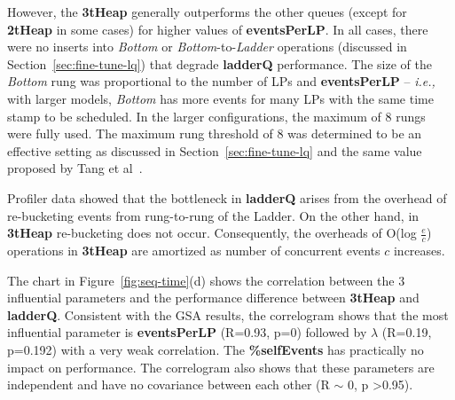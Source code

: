 However, the \textbf{3tHeap} generally outperforms the other queues (except for \textbf{2tHeap} in some cases) for higher values of \textbf{events\-Per\-LP}. In all cases, there were no inserts into \emph{Bottom} or \emph{Bottom}-to-\emph{Ladder} operations (discussed in Section~\ref{sec:fine-tune-lq}) that degrade \textbf{ladderQ} performance. The size of the \emph{Bottom} rung was proportional to the number of LPs and \textbf{eventsPerLP} -- \textit{i.e.,} with larger models, \emph{Bottom} has more events for many LPs with the same time stamp to be scheduled. In the larger configurations, the maximum of 8 rungs were fully used. The maximum rung threshold of 8 was determined to be an effective setting as discussed in Section~\ref{sec:fine-tune-lq} and the same value proposed by Tang et al~\cite{tang-05}.

Profiler data showed that the bottleneck in \textbf{ladderQ} arises from the overhead of re-bucketing events from rung-to-rung of the Ladder. On the other hand, in \textbf{3tHeap} re-bucketing does not occur. Consequently, the overheads of O(log $\frac{e}{c}$) operations in \textbf{3tHeap} are amortized as number of concurrent events $c$ increases.

The chart in Figure~\ref{fig:seq-time}(d) shows the correlation between the 3 influential parameters and the performance difference between \textbf{3tHeap} and \textbf{ladderQ}. Consistent with the GSA results, the correlogram shows that the most influential parameter is \textbf{eventsPerLP} (R=0.93, p=0) followed by $\lambda$ (R=0.19, p=0.192) with a very weak correlation. The \textbf{\%selfEvents} has practically no impact on performance. The correlogram also shows that these parameters are independent and have no covariance between each other
(R $\sim$ 0, p \textgreater 0.95).


